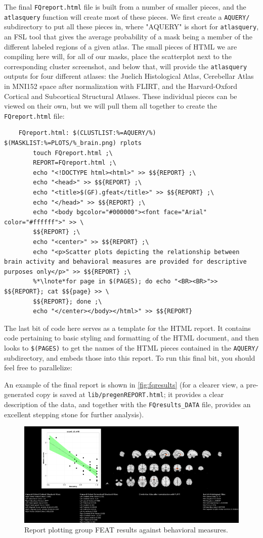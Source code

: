 The final \texttt{FQreport.html} file is built from a number of smaller pieces, and the \texttt{atlasquery} function will create most of these pieces. We first create a \texttt{AQUERY/} subdirectory to put all these pieces in, where "AQUERY" is short for \texttt{atlasquery}, an FSL tool that gives the average probability of a mask being a member of the different labeled regions of a given atlas. The small pieces of HTML we are compiling here will, for all of our masks, place the scatterplot next to the corresponding cluster screenshot, and below that, will provide the \texttt{atlasquery} outputs for four different atlases: the Juelich Histological Atlas, Cerebellar Atlas in MNI152 space after normalization with FLIRT, and the Harvard-Oxford Cortical and Subcortical Structural Atlases. These individual pieces can be viewed on their own, but we will pull them all together to create the \texttt{FQreport.html} file:

\begin{lstlisting}
	FQreport.html: $(CLUSTLIST:%=AQUERY/%) $(MASKLIST:%=PLOTS/%_brain.png) rplots
		touch FQreport.html ;\
		REPORT=FQreport.html ;\
		echo "<!DOCTYPE html><html>" >> $${REPORT} ;\
		echo "<head>" >> $${REPORT} ;\
		echo "<title>$(GF).gfeat</title>" >> $${REPORT} ;\
		echo "</head>" >> $${REPORT} ;\
		echo "<body bgcolor="#000000"><font face="Arial" color="#ffffff">" >> \
		$${REPORT} ;\
		echo "<center>" >> $${REPORT} ;\
		echo "<p>Scatter plots depicting the relationship between brain activity and behavioral measures are provided for descriptive purposes only</p>" >> $${REPORT} ;\
		%*\lnote*for page in $(PAGES); do echo "<BR><BR>">> $${REPORT}; cat $${page} >> \
		$${REPORT}; done ;\
		echo "</center></body></html>" >> $${REPORT}
\end{lstlisting}

The last bit of code here serves as a template for the HTML report. It contains code pertaining to basic styling and formatting of the HTML document, and  then looks to \texttt{\$(PAGES)} to get the names of the HTML pieces contained in the \texttt{AQUERY/} subdirectory, and embeds those into this report. To run this final bit, you should feel free to parallelize:

An example of the final report is shown in \autoref{fig:fqresults} (for a clearer view, a pre-generated copy is saved at \texttt{lib/pregenREPORT.html}; it provides a clear description of the data, and together with the \texttt{FQresults_DATA} file, provides an excellent stepping stone for further analysis).

\begin{figure}
	\begin{center}
          \includegraphics[scale=.6]{images/SSreport.png}
		\caption{Report plotting group FEAT results against behavioral measures.}
                \label{fig:fqresults}
	\end{center}
\end{figure}
